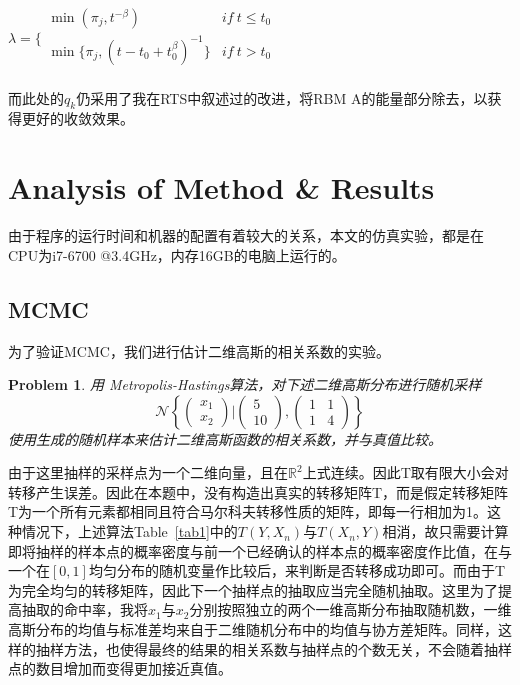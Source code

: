 \documentclass[journal,a4paper]{IEEEtran}
\newtheorem{myPro}{\textbf{Problem}}
\begin{document}
	$\lambda = \Big\{ \begin{matrix}
			\min(\pi_j,t^{-\beta}) & if~t \leq t_0 \\
			\min\{\pi_j,(t-t_0+t_0^{\beta})^{-1}\} & if~t > t_0 \\
			\end{matrix} $
	
	而此处的$q_k$仍采用了我在RTS中叙述过的改进，将RBM A的能量部分除去，以获得更好的收敛效果。
	
	\section{Analysis of Method \& Results}
	由于程序的运行时间和机器的配置有着较大的关系，本文的仿真实验，都是在CPU为i7-6700 @3.4GHz，内存16GB的电脑上运行的。
	\subsection{MCMC}
	为了验证MCMC，我们进行估计二维高斯的相关系数的实验。

	\begin{myPro}
		用 Metropolis-Hastings算法，对下述二维高斯分布进行随机采样
		\begin{equation*}
		\mathcal{N}\left\{\begin{pmatrix}x_1\\x_2\end{pmatrix}\bigg|\begin{pmatrix} 5 \\ 10 \end{pmatrix},\begin{pmatrix} 1 & 1\\1 & 4\end{pmatrix}\right\}
		\end{equation*}
		使用生成的随机样本来估计二维高斯函数的相关系数，并与真值比较。
	\end{myPro}

		由于这里抽样的采样点为一个二维向量，且在$\mathbb{R}^2$上式连续。因此T取有限大小会对转移产生误差。因此在本题中，没有构造出真实的转移矩阵T，而是假定转移矩阵T为一个所有元素都相同且符合马尔科夫转移性质的矩阵，即每一行相加为1。这种情况下，上述算法Table~\ref{tab1}中的$ T(Y,X_n) $与$T(X_n,Y)$相消，故只需要计算即将抽样的样本点的概率密度与前一个已经确认的样本点的概率密度作比值，在与一个在$ [0,1] $均匀分布的随机变量作比较后，来判断是否转移成功即可。而由于T为完全均匀的转移矩阵，因此下一个抽样点的抽取应当完全随机抽取。这里为了提高抽取的命中率，我将$x_1$与$x_2$分别按照独立的两个一维高斯分布抽取随机数，一维高斯分布的均值与标准差均来自于二维随机分布中的均值与协方差矩阵。同样，这样的抽样方法，也使得最终的结果的相关系数与抽样点的个数无关，不会随着抽样点的数目增加而变得更加接近真值。
		
\end{document}
